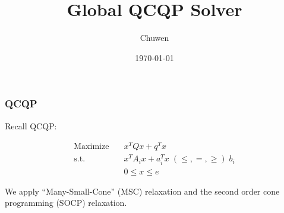 
\usepackage{subfig}
\usepackage[style=verbose]{biblatex}
\usepackage{bm}
\title{Global QCQP Solver}
\author{Chuwen}
\date{\today}




\fontsize{8pt}{11.2}\selectfont
\frame{\titlepage}



\begin{frame}
  \frametitle{QCQP}
  Recall QCQP:

  \begin{equation}
    \begin{aligned}
      \mathrm{Maximize}\quad & x^TQx + q^T x                                   \\
      \mathrm{s.t.}  \quad   & x^{T} A_i x  + a_i^Tx   \; (\le, =, \ge) \; b_i \\
                             & 0\le x\le e
    \end{aligned}
  \end{equation}

  We apply ``Many-Small-Cone'' (MSC) relaxation and the second order cone programming (SOCP) relaxation.
\end{frame}

